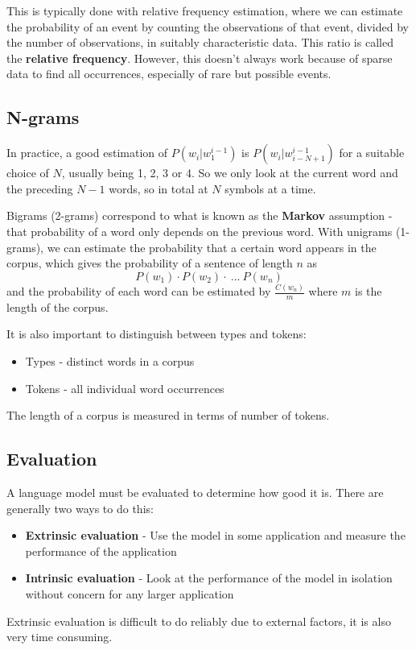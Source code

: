 \documentclass[Report.tex]{subfiles}
\begin{document}
This is typically done with relative frequency estimation, where we can
estimate the probability of an event by counting the observations of that
event, divided by the number of observations, in suitably characteristic data.
This ratio is called the \textbf{relative frequency}. However, this doesn't
always work because of sparse data to find all occurrences, especially of
rare but possible events.

\subsection{N-grams}
In practice, a good estimation of $P(w_i | w^{i-1}_1)$ is
$P(w_i | w^{i-1}_{i-N+1})$ for a suitable choice of $N$, usually being
1, 2, 3 or 4. So we only look at the current word and the preceding
$N-1$ words, so in total at $N$ symbols at a time.

Bigrams (2-grams) correspond to what is known as the \textbf{Markov}
assumption - that probability of a word only depends on the previous word.
With unigrams (1-grams), we can estimate the probability that a certain word
appears in the corpus, which gives the probability of a sentence of length $n$ as
\begin{equation}
P(w_1) \cdot P(w_2) \cdot\ ...\ P(w_n)
\end{equation}
and the probability of each word can be estimated by $\frac{C(w_n)}{m}$ where $m$
is the length of the corpus.

It is also important to distinguish between types and tokens:
\begin{itemize}
\item Types - distinct words in a corpus
\item Tokens - all individual word occurrences
\end{itemize}
The length of a corpus is measured in terms of number of tokens.

\subsection{Evaluation}
A language model must be evaluated to determine how good it is. There are generally
two ways to do this:
\begin{itemize}
\item \textbf{Extrinsic evaluation} - Use the model in some application and measure
  the performance of the application
\item \textbf{Intrinsic evaluation} - Look at the performance of the model in isolation
  without concern for any larger application
\end{itemize}
Extrinsic evaluation is difficult to do reliably due to external factors, it is
also very time consuming.
\end{document}
